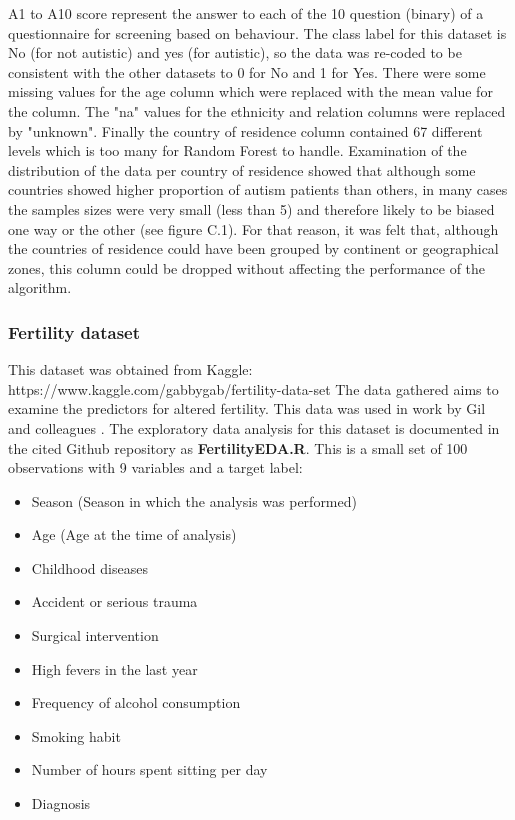A1 to A10 score represent the answer to each of the 10 question (binary) of a questionnaire for screening based on behaviour. 
The class label for this dataset is No (for not autistic) and yes (for autistic), so the data was re-coded to be consistent with the other datasets to 0 for No and 1 for Yes.\newline
There were some missing values for the age column which were replaced with the mean value for the column. The "na" values for the ethnicity and relation columns were replaced by "unknown".\newline
Finally the country of residence column contained 67 different levels which is too many for Random Forest to handle. Examination of the distribution of the data per country of residence showed that although some countries showed higher proportion of autism patients than others, in many cases the samples sizes were very small (less than 5) and therefore likely to be biased one way or the other (see figure C.1). For that reason, it was felt that, although the countries of residence could have been grouped by continent or geographical zones, this column could be dropped without affecting the performance of the algorithm.\newline

\subsubsection{Fertility dataset}
This dataset was obtained from Kaggle:\newline
https://www.kaggle.com/gabbygab/fertility-data-set \newline
The data gathered aims to examine the predictors for altered fertility. This data was used in work by Gil and colleagues \citep{Gil:quR8OHIJ}.\newline
The exploratory data analysis for this dataset is documented in the cited Github repository as \textbf{FertilityEDA.R}.
This is a small set of 100 observations with 9 variables and a target label:
\begin{itemize}
    \item Season (Season in which the analysis was performed)
    \item Age (Age at the time of analysis)
    \item Childhood diseases
    \item Accident or serious trauma
    \item Surgical intervention
    \item High fevers in the last year
    \item Frequency of alcohol consumption
    \item Smoking habit
    \item Number of hours spent sitting per day
    \item Diagnosis
\end{itemize}


